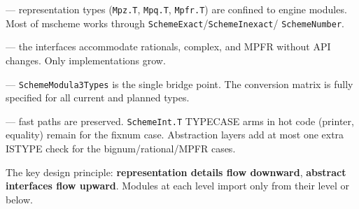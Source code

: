 \documentclass[12pt]{article}
\begin{document}
\begin{description}[nosep]
\item[Clean separation] --- representation types ({\tt Mpz.T},
  {\tt Mpq.T}, {\tt Mpfr.T}) are confined to engine modules.
  Most of mscheme works through {\tt SchemeExact}/{\tt SchemeInexact}/
  {\tt SchemeNumber}.

\item[Forward compatibility] --- the interfaces accommodate
  rationals, complex, and MPFR without API changes.  Only
  implementations grow.

\item[Principled interop] --- {\tt SchemeModula3Types} is the
  single bridge point.  The conversion matrix is fully specified
  for all current and planned types.

\item[Performance] --- fast paths are preserved.
  {\tt SchemeInt.T} TYPECASE arms in hot code (printer, equality)
  remain for the fixnum case.  Abstraction layers add at most
  one extra ISTYPE check for the bignum/rational/MPFR cases.
\end{description}

\noindent The key design principle: \textbf{representation details
flow downward}, \textbf{abstract interfaces flow upward}.
Modules at each level import only from their level or below.
\end{document}
